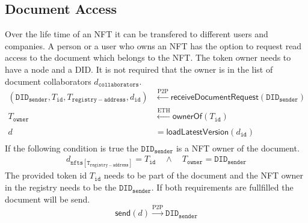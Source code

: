 \subsection{Document Access}
Over the life time of an NFT it can be transfered to different users and companies. A person or a user who owns an NFT has the option to request read access to the document which belongs to the NFT. The token owner needs to have a node and a DID. It is not required that the owner is in the list of document collaborators $d_{\mathtt{collaborators}}$.
\begin{equation}
    \begin{split}
            (\mathtt{DID_{sender}},T_{\mathtt{id}},T_{\mathtt{registry-address}},d_{\mathtt{id}})& \xleftarrow[]{\text{P2P}}  \mathsf{receiveDocumentRequest}(\mathtt{DID_{sender}}) \\
            T_{\mathtt{owner}}  & \xleftarrow[]{\text{ETH}} \mathsf{ownerOf}(T_{\texttt{id}}) \\
               d    &= \mathsf{loadLatestVersion}({d}_{\mathtt{id}}) \\
    \end{split}
\end{equation}
If the following condition is true the $\mathtt{DID_{sender}}$ is a NFT owner of the document.
\begin{equation}
    \begin{split}
     d_{\mathtt{nfts[T_{registry-address}]}} = T_{\mathtt{id}} \quad \land \quad T_{\mathtt{owner}} = \mathtt{DID_{sender}}
    \end{split}
\end{equation}
The provided token id $T_{\mathtt{id}}$ needs to be part of the document and the NFT owner in the registry needs to be the $\mathtt{DID_{sender}}$. If both requirements are fullfilled the document will be send.
\begin{equation}
      \mathsf{send}(d) \xrightarrow[]{\text{P2P}} \mathtt{DID_{sender}}
\end{equation}


